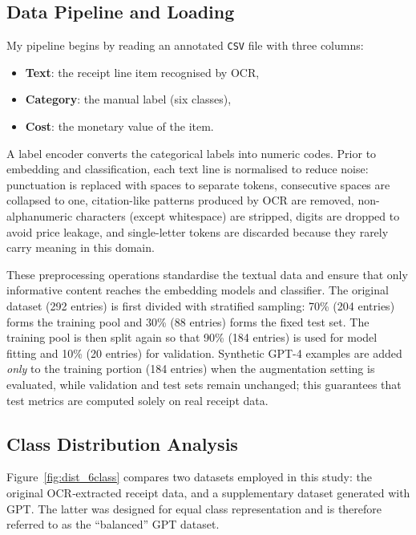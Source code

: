 \documentclass{SGGW-thesis-EN}
\begin{document}
\subsection{Data Pipeline and Loading}
My pipeline begins by reading an annotated \texttt{CSV} file with three columns:
\begin{itemize}
  \item \textbf{Text}: the receipt line item recognised by OCR,
  \item \textbf{Category}: the manual label (six classes), 
  \item \textbf{Cost}: the monetary value of the item.
\end{itemize}
A label encoder converts the categorical labels into numeric codes. Prior to embedding and classification, each text
line is normalised to reduce noise: punctuation is replaced with spaces to separate tokens, consecutive spaces are
collapsed to one, citation-like patterns produced by OCR are removed, non-alphanumeric characters (except whitespace)
are stripped, digits are dropped to avoid price leakage, and single-letter tokens are discarded because they rarely
carry meaning in this domain.

These preprocessing operations standardise the textual data and ensure that only informative content reaches the
embedding models and classifier.  The original dataset (292 entries) is first divided with stratified sampling: 70\%
(204 entries) forms the training pool and 30\% (88 entries) forms the fixed test set.  The training pool is then split
again so that 90\% (184 entries) is used for model fitting and 10\% (20 entries) for validation.  Synthetic GPT-4
examples are added \emph{only} to the training portion (184 entries) when the augmentation setting is evaluated, while
validation and test sets remain unchanged; this guarantees that test metrics are computed solely on real receipt data.


\subsection{Class Distribution Analysis}
Figure~\ref{fig:dist_6class} compares two datasets employed in this study: 
the original OCR‐extracted receipt data, and a supplementary dataset generated with GPT. The latter was designed for equal class
representation and is therefore referred to as the “balanced” GPT dataset.
\end{document}
